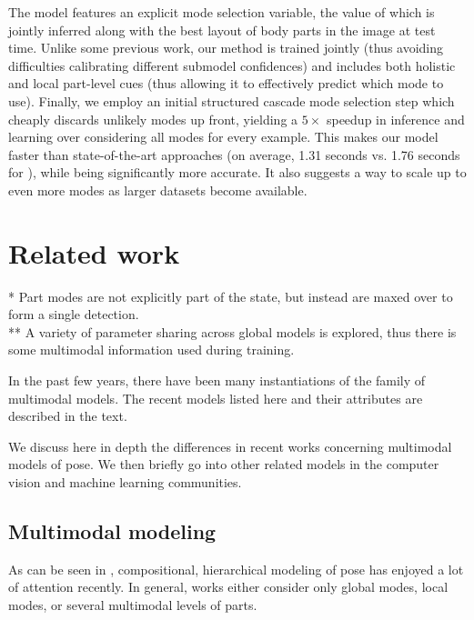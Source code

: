 The model features an explicit mode selection variable, the value of which is 
jointly inferred along with the best layout of body parts in the image at test 
time.  Unlike some previous work, our method is trained jointly (thus avoiding 
difficulties calibrating different submodel confidences) and includes both 
holistic and local part-level cues (thus allowing it to effectively predict 
which mode to use).  Finally, we employ an initial structured cascade mode 
selection step which cheaply discards unlikely modes up front, yielding a 
$5\times$ speedup in inference and learning over considering all modes for 
every example.  This makes our model faster than state-of-the-art approaches 
(on average, 1.31 seconds vs. 1.76 seconds for \citet{deva2011}), while being 
significantly more accurate.  It also suggests a way to scale up to even more 
modes as larger datasets become available.
 

\section{Related work}\label{sec:llps-rel}
 \begin{table}[bt!]
\begin{center}
{\small

}
\end{center}
\footnotesize{ * Part modes are not explicitly part of the state, but instead 
are maxed over to form a single detection.\\  ** A variety of parameter sharing 
across global models is explored, thus there is some multimodal information 
used during training. }
\caption[Family of multimodal pose models.]{In the past few years, there have 
been many instantiations of the family of multimodal models. The recent models 
listed here and their attributes are described in the text. \\
}
\label{tab:rel-work-ps} \end{table}

We discuss here in depth the differences in recent works concerning multimodal 
models of pose.  We then briefly go into other related models in the computer 
vision and machine learning communities.

\subsection{Multimodal modeling}
As can be seen in , compositional, hierarchical modeling of 
pose has enjoyed a lot of attention recently.  In general, works either 
consider only global modes, local modes, or several multimodal levels of parts.

